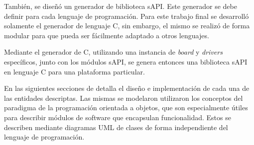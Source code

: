 También, se diseñó un generador de biblioteca sAPI. Este generador se debe definir para cada lenguaje de programación. Para este trabajo final se desarrolló solamente el generador de lenguaje C, sin embargo, el mismo se realizó de forma modular para que pueda ser fácilmente adaptado a otros lenguajes. 

Mediante el generador de C, utilizando una instancia de \emph{board} y \emph{drivers} específicos, junto con los módulos sAPI, se genera entonces una biblioteca sAPI en lenguaje C para una plataforma particular.

En las siguientes secciones de detalla el diseño e implementación de cada una de las entidades descriptas. Las mismas se modelaron utilizaron los conceptos del paradigma de la programación orientada a objetos, que son especialmente útiles para describir módulos de software que encapsulan funcionalidad. Estos se describen mediante diagramas UML de clases de forma independiente del lenguaje de programación.
